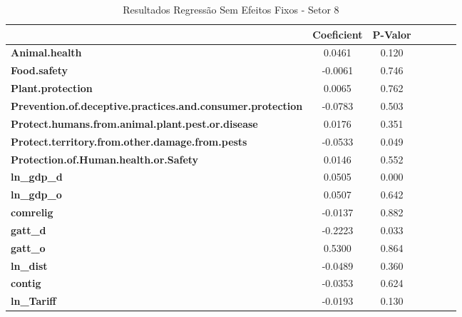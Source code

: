 \begin{table}[ht]
    \begin{center}
        \begin{tabular}{lcccccc}
            & \textbf{Coeficient} & \textbf{P-Valor}\\
            \midrule
\textbf{Animal.health}                                             &       0.0461 &     0.120     \\
\textbf{Food.safety}                                               &      -0.0061 &     0.746     \\
\textbf{Plant.protection}                                          &       0.0065 &     0.762     \\
\textbf{Prevention.of.deceptive.practices.and.consumer.protection} &      -0.0783 &     0.503     \\
\textbf{Protect.humans.from.animal.plant.pest.or.disease}          &       0.0176 &     0.351     \\
\textbf{Protect.territory.from.other.damage.from.pests}            &      -0.0533 &     0.049     \\
\textbf{Protection.of.Human.health.or.Safety}                      &       0.0146 &     0.552     \\
\textbf{ln\_gdp\_d}                                                &       0.0505 &     0.000     \\
\textbf{ln\_gdp\_o}                                                &       0.0507 &     0.642     \\
\textbf{comrelig}                                                  &      -0.0137 &     0.882     \\
\textbf{gatt\_d}                                                   &      -0.2223 &     0.033     \\
\textbf{gatt\_o}                                                   &       0.5300 &     0.864     \\
\textbf{ln\_dist}                                                  &      -0.0489 &     0.360     \\
\textbf{contig}                                                    &      -0.0353 &     0.624     \\
\textbf{ln\_Tariff}                                                &      -0.0193 &     0.130     \\
\bottomrule
\end{tabular}
\caption{ Resultados Regressão Sem Efeitos Fixos - Setor 8}
\end{center}
\end{table}